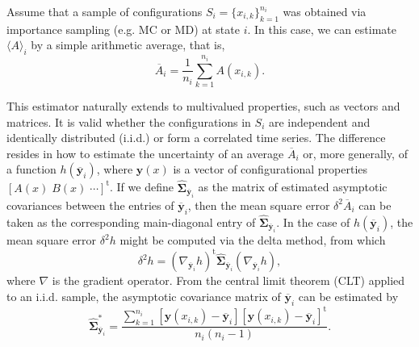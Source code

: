 \documentclass[aip,jcp,reprint,amsmath,amssymb]{revtex4-1}
\newcommand{\mt}[1]{\boldsymbol{\mathbf{#1}}}           %
\newcommand{\vt}[1]{\boldsymbol{\mathbf{#1}}}           %
\newcommand{\tr}[1]{#1^\text{t}}                        %
\begin{document}
Assume that a sample of configurations $S_i = \{x_{i,k}\}_{k=1}^{n_i}$ was obtained via importance sampling\cite{Allen_1987} (e.g. MC or MD) at state $i$. In this case, we can estimate $\langle A \rangle_i$ by a simple arithmetic average, that is,
\begin{equation}
\label{eq:average estimator}
\overline A_i = \frac{1}{n_i} \sum_{k=1}^{n_i} A(x_{i,k}).
\end{equation}

This estimator naturally extends to multivalued properties, such as vectors and matrices. It is valid whether the configurations in $S_i$ are independent and identically distributed (i.i.d.) or form a correlated time series. The difference resides in how to estimate the uncertainty of an average $\overline A_i$ or, more generally, of a function $h(\overline {\vt y}_i)$, where $\vt y(x)$ is a vector of configurational properties $\tr{[A(x) \; B(x) \; \cdots]}$. If we define $\hat{\mt \Sigma}_{\overline{\vt y}_i}$ as the matrix of estimated asymptotic covariances between the entries of $\overline{\vt y}_i$, then the mean square error $\delta^2 \overline A_i$ can be taken as the corresponding main-diagonal entry of $\hat{\mt \Sigma}_{\overline{\vt y}_i}$. In the case of $h(\overline{\vt y}_i)$, the mean square error $\delta^2 h$ might be computed via the delta method,\cite{Greene_2012} from which
\begin{equation}
\label{eq:delta method}
\delta^2 h = \tr{(\nabla_{\overline{\vt y}_i} h)} \hat{\mt \Sigma}_{\overline{\vt y}_i}(\nabla_{\overline{\vt y}_i} h),
\end{equation} 
where $\nabla$ is the gradient operator. From the central limit theorem (CLT) applied to an i.i.d. sample, the asymptotic covariance matrix of $\overline{\vt y}_i$ can be estimated by
\begin{equation*}
\label{eq:asymptotic covariance IID}
\hat{\mt \Sigma}^\ast_{\overline{\vt y}_i} = \frac{\sum\limits_{k=1}^{n_i} \left[\vt y(x_{i,k}) - \overline{\vt y}_i\right] \tr{\left[\vt y(x_{i,k}) - \overline{\vt y}_i\right]}}{n_i(n_i - 1)}.
\end{equation*}
\end{document}
